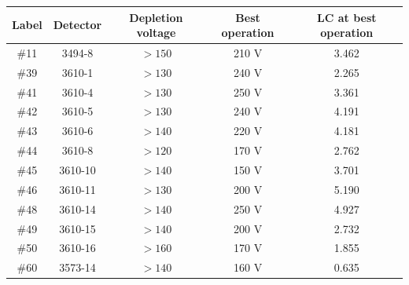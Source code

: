\begin{center}
\begin{tabular}{ccccc}
\toprule
Label & Detector & Depletion voltage & Best operation & LC at best operation \\
\midrule
\#11 & 3494-8   & $>150$ & 210 V & 3.462 \\
\#39 & 3610-1   & $>130$ & 240 V & 2.265 \\
\#41 & 3610-4   & $>130$ & 250 V & 3.361 \\
\#42 & 3610-5   & $>130$ & 240 V & 4.191 \\
\#43 & 3610-6   & $>140$ & 220 V & 4.181 \\
\#44 & 3610-8   & $>120$ & 170 V & 2.762 \\
\#45 & 3610-10  & $>140$ & 150 V & 3.701 \\
\#46 & 3610-11  & $>130$ & 200 V & 5.190 \\
\#48 & 3610-14  & $>140$ & 250 V & 4.927 \\
\#49 & 3610-15  & $>140$ & 200 V & 2.732 \\
\#50 & 3610-16  & $>160$ & 170 V & 1.855 \\
\#60 & 3573-14  & $>140$ & 160 V & 0.635 \\
\bottomrule
\end{tabular}
\end{center}
